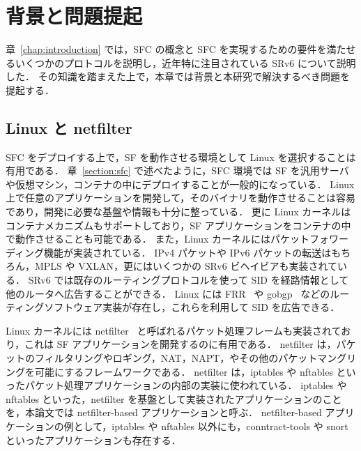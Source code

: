 \chapter{背景と問題提起}
\label{chap:related_works}
章~\ref*{chap:introduction} では，SFC の概念と SFC を実現するための要件を満たせるいくつかのプロトコルを説明し，近年特に注目されている SRv6 について説明した．
その知識を踏まえた上で，本章では背景と本研究で解決するべき問題を提起する．

\section{Linux と netfilter}
\label{section:linux-and-netfilter}
SFC をデプロイする上で，SF を動作させる環境として Linux を選択することは有用である．
章~\ref*{section:sfc} で述べたように，SFC 環境では SF を汎用サーバや仮想マシン，コンテナの中にデプロイすることが一般的になっている．
Linux 上で任意のアプリケーションを開発して，そのバイナリを動作させることは容易であり，開発に必要な基盤や情報も十分に整っている．
更に Linux カーネルはコンテナメカニズムもサポートしており，SF アプリケーションをコンテナの中で動作させることも可能である．
また，Linux カーネルにはパケットフォワーディング機能が実装されている．
IPv4 パケットや IPv6 パケットの転送はもちろん，MPLS や VXLAN，更にはいくつかの SRv6 ビヘイビアも実装されている．
SRv6 では既存のルーティングプロトコルを使って SID を経路情報として他のルータへ広告することができる．
Linux には FRR~\cite{frr} や gobgp~\cite{gobgp} などのルーティングソフトウェア実装が存在し，これらを利用して SID を広告できる．

Linux カーネルには netfilter~\cite*{netfilter} と呼ばれるパケット処理フレームも実装されており，これは SF アプリケーションを開発するのに有用である．
netfilter は，パケットのフィルタリングやロギング，NAT，NAPT，やその他のパケットマングリングを可能にするフレームワークである．
netfilter は，iptables や nftables といったパケット処理アプリケーションの内部の実装に使われている．
iptables や nftables といった，netfilter を基盤として実装されたアプリケーションのことを，本論文では netfilter-based アプリケーションと呼ぶ．
netfilter-based アプリケーションの例として，iptables や nftables 以外にも，conntract-tools\cite{conntract-tools} や snort\cite{snort} といったアプリケーションも存在する．

